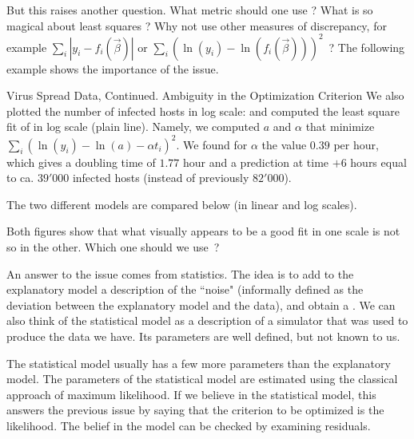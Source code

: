 But this raises another question. What metric should one use ? What
is so magical about least squares ? Why not use other measures of
discrepancy, for example $\sum_i |y_i - f_i(\vec{\beta})|$ or
$\sum_i \left(\ln(y_i) - \ln(f_i(\vec{\beta}))\right)^2$~? The
following example shows the importance of the issue.

\begin{ex}{Virus Spread Data, Continued. Ambiguity in the Optimization Criterion}
We also plotted the number of infected hosts in log scale:
and computed the least square fit of  in log
scale (plain line). Namely, we computed $a$ and $\alpha$ that
minimize $\sum_i \left(\ln(y_i) - \ln(a) - \alpha t_i
\right)^2$. We found for $\alpha$ the value $0.39$ per hour,
which gives a doubling time of $1.77$ hour and a prediction at
time $+6$ hours equal to ca. $39'000$ infected hosts (instead
of previously $82'000$).

The two different models are compared below (in linear and log
scales).

\begin{center}
\end{center}

Both figures show that what visually appears to be a good fit in one
scale is not so in the other. Which one should we use~?
\label{ex-virus-spread-log}
\end{ex}
An answer to the issue comes from statistics. The idea is to add to
the explanatory model a description of the ``noise" (informally
defined as the deviation between the explanatory model and the
data), and obtain a . We can also think of the
statistical model as a description of a simulator that was used to
produce the data we have. Its parameters are well defined, but not
known to us.

The statistical model usually has a few more parameters than the
explanatory model. The parameters of the statistical model are
estimated using the classical approach of maximum likelihood. If we
believe in the statistical model, this answers the previous issue by
saying that the criterion to be optimized is the likelihood. The
belief in the model can be checked by examining residuals.

